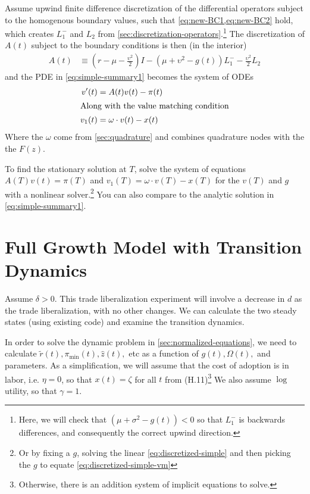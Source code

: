 \documentclass[11pt]{article}
\begin{document}
Assume upwind finite difference discretization of the differential operators subject to the homogenous boundary values, such that \cref{eq:new-BC1,eq:new-BC2} hold, which creates $L^{-}_1$ and $L_2$ from \cref{sec:discretization-operators}.\footnote{Here, we will check that $(\mu+ \sigma^2 - g(t)) < 0$ so that $L^{-}_1$ is backwards differences, and consequently the correct upwind direction.}  The discretization of $A(t)$ subject to the boundary conditions is then (in the interior)
\begin{align}
A(t) &\equiv \left(r - \mu - \frac{\upsilon^2}{2}\right) I - (\mu + \upsilon^2 - g(t)) L^{-}_1 - \tfrac{\upsilon^2}{2} L_2\label{eq:A-def-simple}
\end{align}
and the PDE in \cref{eq:simple-summary1} becomes the system of ODEs
\begin{align}
	v'(t) &= A(t) v(t) - \pi(t)\label{eq:discretized-simple}\\
	\intertext{Along with the value matching condition}
	v_1(t) &= \omega \cdot v(t) - x(t)\label{eq:discretized-simple-vm}
\end{align}
Where the $\omega$ come from \cref{sec:quadrature} and combines quadrature nodes with the the $F(z)$.

To find the stationary solution at $T$, solve the system of equations $A(T) v(t) = \pi(T)$ and $v_1(T) = \omega \cdot v(T) - x(T)$ for the $v(T)$ and $g$ with a nonlinear solver.\footnote{Or by fixing a $g$, solving the linear \cref{eq:discretized-simple} and then picking the $g$ to equate \cref{eq:discretized-simple-vm} }  You can also compare to the analytic solution in \cref{eq:simple-summary1}.

\section{Full Growth Model with Transition Dynamics}
Assume $\delta > 0$.  This trade liberalization experiment will involve a decrease in $d$ as the trade liberalization, with no other changes.  We can calculate the two steady states (using existing code) and examine the transition dynamics.

In order to solve the dynamic problem in \cref{sec:normalized-equations}, we need to calculate $\tilde{r}(t), \pi_{\min}(t),\hat{z}(t),$ etc  as a function of $g(t), \Omega(t),$ and parameters.  As a simplification, we will assume that the cost of adoption is in labor, i.e. $\eta = 0$, so that $x(t) = \zeta$ for all $t$ from (H.11)\footnote{Otherwise, there is an addition system of implicit equations to solve.}  We also assume $\log$ utility, so that $\gamma = 1$.
\end{document}
